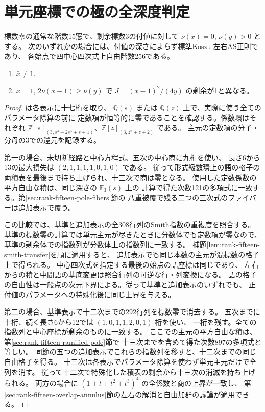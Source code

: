 \section{単元座標での極の全深度判定}
\label{sec:rank-fifteen-unit-pole-depth}
\begin{theorem}\label{thm:rank-fifteen-unit-pole-depth}
標数零の通常な階数15窓で、剰余標数3の付値に対して $\nu(x)=0$, $\nu(y)>0$ とする。
次のいずれかの場合には、付値の深さによらず標準Koszul左右AS正則であり、
各始点で四中心四次式上自由階数256である。
\begin{enumerate}
\item $\bar x\ne1$.
\item $\bar x=1$, $2\nu(x-1)\ge\nu(y)$ で $J=(x-1)^2/(4y)$ の剰余が1と異なる。
\end{enumerate}
\end{theorem}
\begin{proof}
 は各表示に十七桁を取り、
$\mathbb Q(s)$ または $\mathbb Q(z)$ 上で、実際に使う全てのパラメータ除算の前に
定数項が恒等的に零であることを確認する。係数環はそれぞれ
$\mathbb Z[s]_{(3,s^4+2s^3+s+1)}$、$\mathbb Z[z]_{(3,z^2+z+2)}$ である。
主元の定数項の分子・分母の3での還元を記録する。

第一の場合、未切断経路と中心方程式、五次の中心商に九桁を使い、
長さ6から13の最大損失は $(2,1,1,1,1,0,1,0)$ である。
従って形式級数環上の語の格子の両積表を最後まで持ち上げられ、十三次で商は零となる。
使用した定数係数の平方自由な積は、同じ深さの $\mathbb F_3(s)$ 上の
計算で得た次数121の多項式に一致する。第\ref{sec:rank-fifteen-pole-fibers}節の
八重被覆で残る二つの三次式のファイバーは追加表示で覆う。

この比較では、基準と追加表示の全308行列のSmith指数の重複度を照合する。
基準の標数零の計算では単元主元が尽きたときに分数体でも定数項が零なので、
基準の剰余体での指数列が分数体上の指数列に一致する。
補題\ref{lem:rank-fifteen-smith-transfer}を順に適用すると、
追加表示でも同じ本数の主元が混標数の格子上で得られる。
中心四次式を指定する最後の始点の語座標は同じであり、
左右からの積と中間語の基底変更は照合行列の可逆な行・列変換になる。
語の格子の自由性は一般点の次元下界による。従って基準と追加表示のいずれでも、
正付値のパラメータへの特殊化後に同じ上界を与える。

第二の場合、基準表示で十二次までの292行列を標数零で消去する。
五次までに十桁、続く長さ6から12では $(1,0,1,1,2,0,1)$ 桁を使い、
一桁を残す。全ての指数列と中心座標が剰余のものに一致する。
ここでの主元の平方自由な積は、第\ref{sec:rank-fifteen-ramified-pole}節で
十三次までを含めて得た次数897の多項式と等しい。
同節の五つの追加表示でこれらの指数列を移すと、十二次までの同じ自由格子を得る。
十三次は各表示でパラメータ除算を使わず単元主元だけで全列を消す。
従って十二次で特殊化した積表の剰余から十三次の消滅を持ち上げられる。
両方の場合に $(1+t+t^2+t^3)^4$ の全係数と商の上界が一致し、
第\ref{sec:rank-fifteen-overlap-annulus}節の左右の解消と自由加群の議論が適用できる。
\end{proof}
